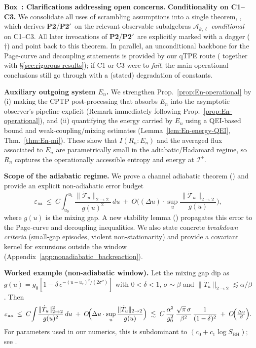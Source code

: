 \documentclass[aps,prd,preprint,onecolumn,superscriptaddress,nofootinbib,longbibliography,floatfix,11pt,showpacs,showkeys]{revtex4-2}
\newcommand{\Ptwo}{\textbf{P2}\xspace}
\newcommand{\PtwoPrime}{\textbf{P2$'$}\xspace}
\newcounter{boxedresult}
\newenvironment{boxedresult}[1]{\refstepcounter{boxedresult}\begin{infobox}\noindent\textbf{Box~\theboxedresult: #1.}}{\end{infobox}}
\newcommand{\SBH}{\ensuremath{S_{\mathrm{BH}}}}
\theoremstyle{plain}
\theoremstyle{definition}
\theoremstyle{remark}
\begin{document}
\begin{boxedresult}{Clarifications addressing open concerns}\label{box:concern-resolution}
\noindent\textbf{Conditionality on C1--C3.}
We consolidate all uses of scrambling assumptions into a single theorem, , which derives \Ptwo/\PtwoPrime\ on the relevant observable subalgebras $\mathscr{A}_{k,\ell}$ \emph{conditional} on C1--C3. All later invocations of \Ptwo/\PtwoPrime\ are explicitly marked with a dagger ($\dagger$) and point back to this theorem. In parallel, an unconditional backbone for the Page-curve and decoupling statements is provided by our qTPE route ( together with \S\ref{sec:rigorous-results}); if C1 or C3 were to \emph{fail}, the main operational conclusions still go through with a (stated) degradation of constants.

\medskip
\noindent\textbf{Auxiliary outgoing system $E_n$.}
We strengthen Prop.~\ref{prop:En-operational} by (i) making the CPTP post-processing that absorbs $E_n$ into the asymptotic observer's pipeline explicit (Remark immediately following Prop.~\ref{prop:En-operational}), and (ii) quantifying the energy carried by $E_n$ using a QEI-based bound and weak-coupling/mixing estimates (Lemma~\ref{lem:En-energy-QEI}, Thm.~\ref{thm:En-mi}). These show that $I(R_n{:}E_n)$ and the averaged flux associated to $E_n$ are parametrically small in the adiabatic/Hadamard regime, so $R_n$ captures the operationally accessible entropy and energy at $\mathscr{I}^+$.

\medskip
\noindent\textbf{Scope of the adiabatic regime.}
We prove a channel adiabatic theorem () and provide an explicit non-adiabatic error budget
\[
\varepsilon_{\mathrm{na}}
\ \le\
 C\!\int_{u_0}^{u_1}\!\frac{\|\dot{\mathcal{T}}_u\|_{2\to 2}}{g(u)^2}\,du
\ +\ O\!\Big((\Delta u)\cdot \sup_u \frac{\|\dot{\mathcal{T}}_u\|_{2\to 2}}{g(u)}\Big),
\]
where $g(u)$ is the mixing gap. A new stability lemma () propagates this error to the Page-curve and decoupling inequalities. We also state concrete \emph{breakdown criteria} (small-gap episodes, violent non-stationarity) and provide a covariant kernel for excursions outside the window (Appendix~\ref{app:nonadiabatic_backreaction}).

% 
\medskip\noindent\textbf{Worked example (non-adiabatic window).}
Let the mixing gap dip as $g(u)=g_0[1-\delta\,e^{-(u-u_c)^2/(2\sigma^2)}]$ with $0<\delta<1$, $\sigma\!\sim\!\beta$ and $\|\dot T_u\|_{2\to2}\!\lesssim\!\alpha/\beta$. Then
\[
\varepsilon_{\rm na}\;\le\; C\!\int\! \frac{\|\dot T_u\|_{2\to2}^2}{g(u)^2}\,du\;+\;O\!\Bigl(\Delta u\cdot \sup_u\frac{\|\dot T_u\|_{2\to2}}{g(u)}\Bigr)
\;\lesssim\;
C\,\frac{\alpha^2}{g_0^2}\,\frac{\sqrt{\pi}\,\sigma}{\beta^2}\,\frac{1}{(1-\delta)^2}\;+\;O\!\Bigl(\tfrac{\Delta u}{\beta}\Bigr).
\]
For parameters used in our numerics, this is subdominant to $(c_0\!+\!c_1\log\SBH)$; see .


\end{boxedresult}
\end{document}
